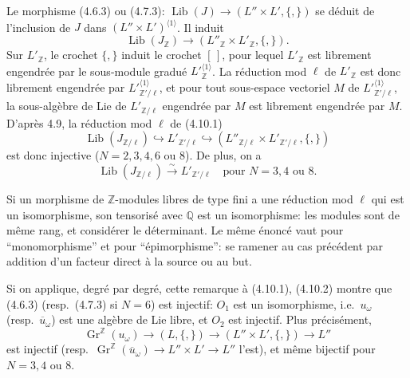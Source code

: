 \documentclass[11pt,a4paper]{article}
\theoremstyle{plain}
\theoremstyle{definition}
\DeclareMathOperator{\Lib}{Lib}
\newcommand{\Q}{\mathbb{Q}}
\newcommand{\Z}{\mathbb{Z}}
\newcommand{\Gr}{\operatorname{Gr}}
\begin{document}
\subsection{}
Le morphisme (4.6.3) ou (4.7.3): $\Lib(J) \to (L'' \times L', \{,\})$ se d\'eduit de l'inclusion de $J$ dans $(L'' \times L')^{\langle 1 \rangle}$. Il induit
\begin{equation}\label{eq:4.10.1}
\Lib(J_\Z) \to (L''_\Z \times L'_\Z, \{,\}).
\end{equation}
Sur $L'_\Z$, le crochet $\{,\}$ induit le crochet $[\,]$, pour lequel $L'_\Z$ est librement engendr\'ee par le sous-module gradu\'e $L'^{\langle 1 \rangle}_{\Z}$. La r\'eduction mod $\ell$ de $L'_\Z$ est donc librement engendr\'ee par $L'^{\langle 1 \rangle}_{\Z'/\ell}$, et pour tout sous-espace vectoriel $M$ de $L'^{\langle 1 \rangle}_{\Z'/\ell}$, la sous-alg\`ebre de Lie de $L'_{\Z/\ell}$ engendr\'ee par $M$ est librement engendr\'ee par $M$. D'apr\`es 4.9, la r\'eduction mod $\ell$ de (4.10.1)
\begin{equation}\label{eq:4.10.2}
\Lib(J_{\Z/\ell}) \hookrightarrow L'_{\Z'/\ell} \hookrightarrow (L''_{\Z/\ell} \times L'_{\Z'/\ell}, \{,\})
\end{equation}
est donc injective ($N=2,3,4,6$ ou $8$). De plus, on a
\begin{equation}\label{eq:4.10.3}
\Lib(J_{\Z/\ell}) \xrightarrow{\sim} L'_{\Z'/\ell} \quad \text{pour }N=3,4\text{ ou }8.
\end{equation}

Si un morphisme de $\Z$-modules libres de type fini a une r\'eduction mod $\ell$ qui est un isomorphisme, son tensoris\'e avec $\Q$ est un isomorphisme: les modules sont de m\^eme rang, et consid\'erer le d\'eterminant. Le m\^eme \'enonc\'e vaut pour ``monomorphisme'' et pour ``\'epimorphisme'': se ramener au cas pr\'ec\'edent par addition d'un facteur direct \`a la source ou au but.

Si on applique, degr\'e par degr\'e, cette remarque \`a (4.10.1), (4.10.2) montre que (4.6.3) (resp.~(4.7.3) si $N=6$) est injectif: $O_1$ est un isomorphisme, i.e.~$u_\omega$ (resp.~$\overline{u}_\omega$) est une alg\`ebre de Lie libre, et $O_2$ est injectif. Plus pr\'ecis\'ement,
\begin{equation}\label{eq:4.10.4}
\Gr^\Z(u_\omega) \to (L, \{,\}) \to (L'' \times L', \{,\}) \to L''
\end{equation}
est injectif (resp.~$\Gr^\Z(\overline{u}_\omega) \to L'' \times L' \to L''$ l'est), et m\^eme bijectif pour $N=3,4$ ou $8$.
\end{document}
